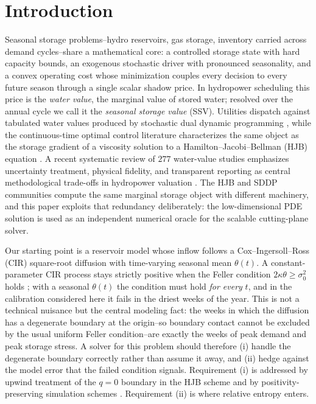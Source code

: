 \documentclass[pdflatex,sn-mathphys-num]{sn-jnl}
\theoremstyle{thmstyleone}
\theoremstyle{thmstyletwo}
\theoremstyle{thmstylethree}
\begin{document}
\section{Introduction}
\label{sec:intro}

Seasonal storage problems--hydro reservoirs, gas storage, inventory
carried across demand cycles--share a mathematical core: a controlled
storage state with hard capacity bounds, an exogenous stochastic driver
with pronounced seasonality, and a convex operating cost whose minimization
couples every decision to every future season through a single scalar
shadow price. In hydropower scheduling this price is the \emph{water
value}, the marginal value of stored water; resolved over the annual
cycle we call it the \emph{seasonal storage value} (SSV). Utilities
dispatch against tabulated water values produced by stochastic dual
dynamic programming \citep[SDDP;][]{pereira1991}, while the continuous-time
optimal control literature characterizes the same object as the storage
gradient of a viscosity solution to a Hamilton--Jacobi--Bellman (HJB)
equation \citep{crandall1992,fleming2006}. A recent systematic review of
$277$ water-value studies emphasizes uncertainty treatment, physical fidelity,
and transparent reporting as central methodological trade-offs in hydropower
valuation \citep{pavicevic2026water}. The HJB and SDDP communities compute the
same marginal storage object with different machinery, and this paper exploits
that redundancy deliberately: the low-dimensional PDE solution is used as an
independent numerical oracle for the scalable cutting-plane solver.

Our starting point is a reservoir model whose inflow follows a
Cox--Ingersoll--Ross (CIR) square-root diffusion \citep{cir1985} with
time-varying seasonal mean $\theta(t)$. A constant-parameter CIR process
stays strictly positive when the Feller condition $2\kappa\theta \ge
\sigma_0^2$ holds \citep{feller1951}; with a seasonal $\theta(t)$ the
condition must hold \emph{for every} $t$, and in the calibration considered
here it fails in the driest weeks of the year. This is not a technical
nuisance but the central modeling fact: the weeks in which the diffusion
has a degenerate boundary at the origin--so boundary contact cannot be
excluded by the usual uniform Feller condition--are exactly the weeks of
peak demand and peak storage stress. A solver for this problem should
therefore (i) handle the degenerate boundary correctly rather than assume
it away, and (ii) hedge against the model error that the failed condition
signals. Requirement (i) is addressed by upwind treatment of the $q=0$
boundary in the HJB scheme and by positivity-preserving simulation schemes
\citep{alfonsi2005,lord2010}. Requirement (ii) is where relative entropy
enters.
\end{document}
